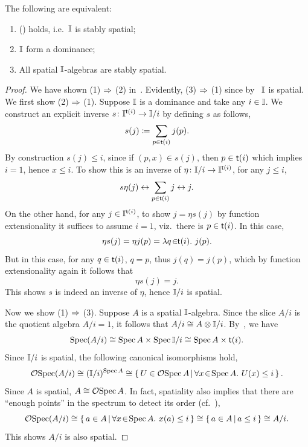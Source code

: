 \begin{theorem}\label{thm:chardominance}
  The following are equivalent:
  \begin{enumerate}
    \item (\AxiomSQCI) holds, i.e.\ $\mathbb{I}$ is stably spatial;
    \item $\mathbb{I}$ form a dominance;
    \item All spatial $\mathbb{I}$-algebras are stably spatial.
  \end{enumerate}
\end{theorem}
\begin{proof}
  We have shown (1) $\Rightarrow$ (2) in~. Evidently, (3) $\Rightarrow$ (1) since by~ $\mathbb{I}$ is spatial. We first show (2) $\Rightarrow$ (1). Suppose $\mathbb{I}$ is a dominance and take any $i \in \mathbb{I}$. We construct an explicit inverse $s \colon \mathbb{I}^{\mathsf{t}(i)} \to \mathbb{I}/i$ by defining $s$ as follows,
  \[ s(j) \coloneq \sum_{p\in\mathsf{t}(i)} j(p). \]
  By construction $s(j) \le i$, since if $(p,x) \in s(j)$, then $p \in \mathsf{t}(i)$ which implies $i = 1$, hence $x \le i$. To show this is an inverse of $\eta \colon \mathbb{I}/i \to \mathbb{I}^{\mathsf{t}(i)}$, for any $j \le i$,
  \[ s\eta(j) \leftrightarrow \sum_{p\in\mathsf{t}(i)}j \leftrightarrow j. \]
  On the other hand, for any $j\in\mathbb{I}^{\mathsf{t}(i)}$, to show $j = \eta s(j)$ by function extensionality it suffices to assume $i = 1$, viz.\ there is $p\in\mathsf{t}(i)$. In this case, 
  \[ \eta s(j) = \eta j(p) = \lambda q\!\in\!\!\mathsf{t}(i).\  j(p). \]
  But in this case, for any $q\in\mathsf{t}(i)$, $q = p$, thus $j(q) = j(p)$, which by function extensionality again it follows that 
  \[ \eta s(j) = j. \]
  This shows $s$ is indeed an inverse of $\eta$, hence $\mathbb{I}/i$ is spatial.

  Now we show (1) $\Rightarrow$ (3). Suppose $A$ is a spatial $\mathbb{I}$-algebra. Since the slice $A/i$ is the quotient algebra $A/i = 1$, it follows that $A/i \cong A \otimes \mathbb{I}/i$. By~, we have
  \[ \operatorname{Spec}(A/i) \cong \operatorname{Spec} A \times \operatorname{Spec}{\mathbb{I}/i} \cong \operatorname{Spec} A \times \mathsf{t}(i). \]
  Since $\mathbb{I}/i$ is spatial, the following canonical isomorphisms hold,
  \[ \mathcal{O}{\operatorname{Spec}(A/i)} \cong (\mathbb{I}/i)^{\operatorname{Spec} A} \cong \left\{\,U\in\mathcal{O}{\operatorname{Spec} A}\,\middle|\,\forall x\!\in\!\operatorname{Spec} A.\  U(x) \le i\,\right\}. \]
  Since $A$ is spatial, $A \cong \mathcal{O}{\operatorname{Spec} A}$. In fact, spatiality also implies that there are ``enough points'' in the spectrum to detect its order (cf.~),
  \[ \mathcal{O}{\operatorname{Spec}(A/i)} \cong \left\{\,a\in A\,\middle|\,\forall x\!\in\!\operatorname{Spec} A.\  x(a) \le i\,\right\} \cong \left\{\,a\in A\,\middle|\,a \le i\,\right\} \cong A/i. \]
  This shows $A/i$ is also spatial.
\end{proof}


